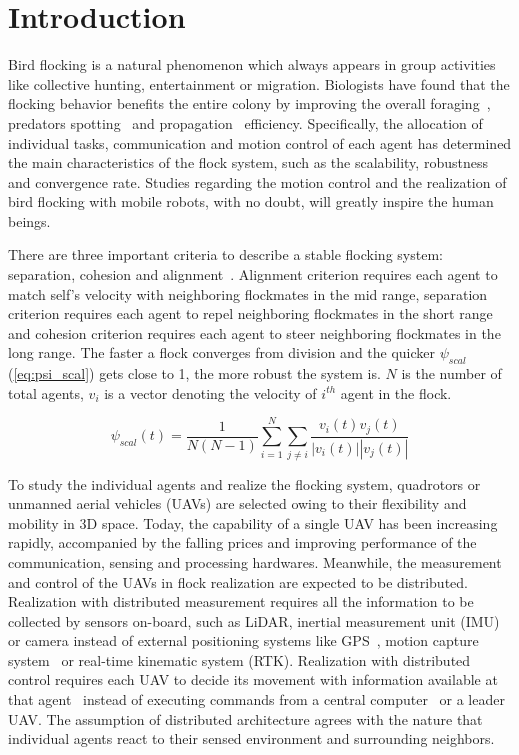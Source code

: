 \chapter{Introduction}\label{introduction}

Bird flocking is a natural phenomenon which always appears in group activities like collective hunting, entertainment or migration. Biologists have found that the flocking behavior benefits the entire colony by improving the overall foraging~\cite{Foraging}, predators spotting~\cite{Predator} and propagation~\cite{Propagation} efficiency. Specifically, the allocation of individual tasks, communication and motion control of each agent has determined the main characteristics of the flock system, such as the scalability, robustness and convergence rate. Studies regarding the motion control and the realization of bird flocking with mobile robots, with no doubt, will greatly inspire the human beings.

There are three important criteria to describe a stable flocking system: separation, cohesion and alignment~\cite{Reynolds1987}. Alignment criterion requires each agent to match self's velocity with neighboring flockmates in the mid range, separation criterion requires each agent to repel neighboring flockmates in the short range and cohesion criterion requires each agent to steer neighboring flockmates in the long range. The faster a flock converges from division and the quicker $\psi_{scal}$ (\ref{eq:psi_scal}) gets close to 1, the more robust the system is. $N$ is the number of total agents, $v_i$ is a vector denoting the velocity of $i^{th}$ agent in the flock.

\begin{equation}\label{eq:psi_scal}
\psi_{scal}(t)=\frac{1}{N(N-1)}\sum^N_{i=1}\sum_{j\neq i}\frac{v_i(t)v_j(t)}{|v_i(t)||v_j(t)|}
\end{equation}

To study the individual agents and realize the flocking system, quadrotors or unmanned aerial vehicles (UAVs) are selected owing to their flexibility and mobility in 3D space. Today, the capability of a single UAV has been increasing rapidly, accompanied by the falling prices and improving performance of the communication, sensing and processing hardwares. Meanwhile, the measurement and control of the UAVs in flock realization are expected to be distributed. Realization with distributed measurement requires all the information to be collected by sensors on-board, such as LiDAR, inertial measurement unit (IMU) or camera instead of external positioning systems like GPS~\cite{Vicsek2018}, motion capture system~\cite{Swarm2018,MPC} or real-time kinematic system (RTK). Realization with distributed control requires each UAV to decide its movement with information available at that agent~\cite{MAV2017} instead of executing commands from a central computer~\cite{CAPT,POMDP,Kumar2018} or a leader UAV. The assumption of distributed architecture agrees with the nature that individual agents react to their sensed environment and surrounding neighbors.

